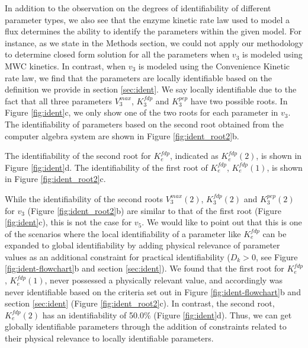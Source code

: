 \documentclass[10pt]{article}
\begin{document}
	In addition to the observation on the degrees of identifiability of different parameter types, we also see that the enzyme kinetic rate law used to model a flux determines the ability to identify the parameters within the given model. For instance, as we state in the Methods section, we could not apply our methodology to determine closed form solution for all the parameters when $v_3$ is modeled using MWC kinetics. In contrast, when $v_3$ is modeled using the Convenience Kinetic rate law, we find that the parameters are locally identifiable based on the definition we provide in section \ref{sec:ident}. We say locally identifiable due to the fact that all three parameters $V_3^{max}$, $K_3^{fdp}$ and $K_3^{pep}$ have two possible roots. In Figure \ref{fig:ident}c, we only show one of the two roots for each parameter in $v_3$. The identifiability of parameters based on the second root obtained from the computer algebra system are shown in Figure \ref{fig:ident_root2}b. 
	
The identifiability of the second root for $K_e^{fdp}$, indicated as $K_e^{fdp}(2)$, is shown in Figure \ref{fig:ident}d. The identifiability of the first root of $K_e^{fdp}$, $K_e^{fdp}(1)$, is shown in Figure \ref{fig:ident_root2}c.
	
	While the identifiability of the second roots $V_3^{max}(2)$, $K_3^{fdp}(2)$ and $K_3^{pep}(2)$ for $v_3$ (Figure \ref{fig:ident_root2}b) are similar to that of the first root (Figure \ref{fig:ident}c), this is not the case for $v_5$. We would like to point out that this is one of the scenarios where the local identifiability of a parameter like $K_e^{fdp}$ can be expanded to global identifiability by adding physical relevance of parameter values as an additional constraint for practical identifiability ($D_k>0$, see Figure \ref{fig:ident-flowchart}b and section \ref{sec:ident}). We found that the first root for $K_e^{fdp}$, $K_e^{fdp}(1)$, never possessed a physically relevant value, and accordingly was never identifiable based on the criteria set out in Figure \ref{fig:ident-flowchart}b and section \ref{sec:ident} (Figure \ref{fig:ident_root2}c). In contrast, the second root, $K_e^{fdp}(2)$ has an identifiability of 50.0\% (Figure \ref{fig:ident}d). Thus, we can get globally identifiable parameters through the addition of constraints related to their physical relevance to locally identifiable parameters. 
	
\end{document}
